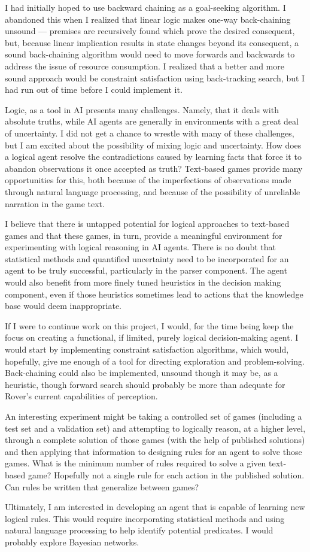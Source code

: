 I had initially hoped to use backward chaining as a goal-seeking
algorithm. I abandoned this when I realized that linear logic makes
one-way back-chaining unsound --- premises are recursively found which
prove the desired consequent, but, because linear implication results in
state changes beyond its consequent, a sound back-chaining algorithm
would need to move forwards and backwards to address the issue of
resource consumption. I realized that a better and more sound approach
would be constraint satisfaction using back-tracking search, but I had
run out of time before I could implement it.

Logic, as a tool in AI presents many challenges. Namely, that it deals
with absolute truths, while AI agents are generally in environments with
a great deal of uncertainty. I did not get a chance to wrestle with many
of these challenges, but I am excited about the possibility of mixing
logic and uncertainty. How does a logical agent resolve the
contradictions caused by learning facts that force it to abandon
observations it once accepted as truth? Text-based games provide many
opportunities for this, both because of the imperfections of
observations made through natural language processing, and because of
the possibility of unreliable narration in the game text.

I believe that there is untapped potential for logical approaches to
text-based games and that these games, in turn, provide a meaningful
environment for experimenting with logical reasoning in AI agents. There
is no doubt that statistical methods and quantified uncertainty need to
be incorporated for an agent to be truly successful, particularly in the
parser component. The agent would also benefit from more finely tuned
heuristics in the decision making component, even if those heuristics
sometimes lead to actions that the knowledge base would deem
inappropriate.

If I were to continue work on this project, I would, for the time being
keep the focus on creating a functional, if limited, purely logical
decision-making agent. I would start by implementing constraint
satisfaction algorithms, which would, hopefully, give me enough of a
tool for directing exploration and problem-solving. Back-chaining could
also be implemented, unsound though it may be, as a heuristic, though
forward search should probably be more than adequate for Rover's current
capabilities of perception.

An interesting experiment might be taking a controlled set of games
(including a test set and a validation set) and attempting to logically
reason, at a higher level, through a complete solution of those games
(with the help of published solutions) and then applying that
information to designing rules for an agent to solve those games. What
is the minimum number of rules required to solve a given text-based
game? Hopefully not a single rule for each action in the published
solution. Can rules be written that generalize between games?

Ultimately, I am interested in developing an agent that is capable of
learning new logical rules. This would require incorporating statistical
methods and using natural language processing to help identify potential
predicates. I would probably explore Bayesian networks.
